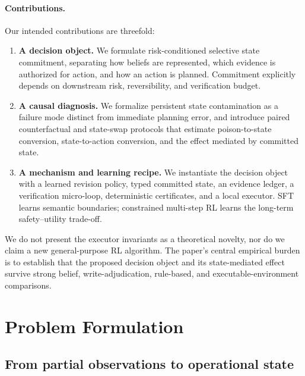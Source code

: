 \documentclass{article}
\begin{document}
\paragraph{Contributions.}
Our intended contributions are threefold:
\begin{enumerate}[leftmargin=*,itemsep=2pt]
    \item \textbf{A decision object.} We formulate risk-conditioned selective state commitment, separating how beliefs are represented, which evidence is authorized for action, and how an action is planned. Commitment explicitly depends on downstream risk, reversibility, and verification budget.
    \item \textbf{A causal diagnosis.} We formalize persistent state contamination as a failure mode distinct from immediate planning error, and introduce paired counterfactual and state-swap protocols that estimate poison-to-state conversion, state-to-action conversion, and the effect mediated by committed state.
    \item \textbf{A mechanism and learning recipe.} We instantiate the decision object with a learned revision policy, typed committed state, an evidence ledger, a verification micro-loop, deterministic certificates, and a local executor. SFT learns semantic boundaries; constrained multi-step RL learns the long-term safety--utility trade-off.
\end{enumerate}
We do not present the executor invariants as a theoretical novelty, nor do we claim a new general-purpose RL algorithm. The paper's central empirical burden is to establish that the proposed decision object and its state-mediated effect survive strong belief, write-adjudication, rule-based, and executable-environment comparisons.

\section{Problem Formulation}
\label{sec:problem}

\subsection{From partial observations to operational state}
\end{document}

